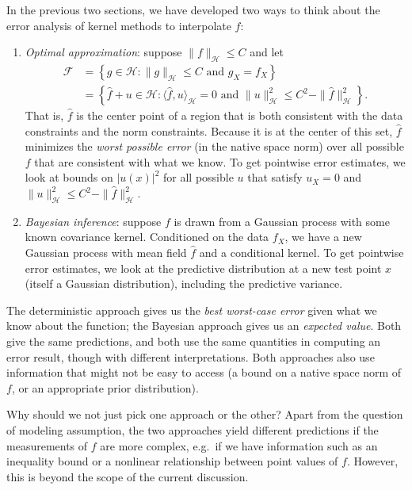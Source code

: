 \documentclass[12pt, leqno]{article} %
\begin{document}
In the previous two sections, we have developed two ways to think
about the error analysis of kernel methods to interpolate $f$:
\begin{enumerate}
\item {\em Optimal approximation}: suppose $\|f\|_{\mathcal{H}} \leq C$ and let
  \begin{align*}
  \mathcal{F} &=
    \left\{
    g \in \mathcal{H} : \|g\|_{\mathcal{H}} \leq C \mbox{ and } g_X = f_X
    \right\} \\
    &=
    \left\{
      \hat{f} + u \in \mathcal{H} :
      \langle \hat{f}, u \rangle_{\mathcal{H}} = 0 \mbox{ and }
      \|u\|_{\mathcal{H}}^2 \leq C^2 - \|\hat{f}\|_{\mathcal{H}}^2
    \right\}.
  \end{align*}
  That is, $\hat{f}$ is the center point of a region that is both
  consistent with the data constraints and the norm constraints.
  Because it is at the center of this set, $\hat{f}$
  minimizes the {\em worst possible error} (in the native space norm)
  over all possible $f$
  that are consistent with what we know.  To get pointwise error
  estimates, we look at bounds on $|u(x)|^2$ for all possible $u$ that
  satisfy $u_X = 0$ and $\|u\|_{\mathcal{H}}^2 \leq C^2 -
  \|\hat{f}\|_{\mathcal{H}}^2$.
\item {\em Bayesian inference}: suppose $f$ is drawn from a Gaussian
  process with some known covariance kernel.  Conditioned on the data
  $f_X$, we have a new Gaussian process with mean field $\hat{f}$
  and a conditional kernel.  To get pointwise error estimates, we look
  at the predictive distribution at a new test point $x$ (itself a
  Gaussian distribution), including the predictive variance.
\end{enumerate}
The deterministic approach gives us the {\em best worst-case error}
given what we know about the function; the Bayesian approach gives us
an {\em expected value}.  Both give the same predictions, and both
use the same quantities in computing an error result, though with
different interpretations.  Both approaches also use information that might
not be easy to access (a bound on a native space norm of $f$, or an
appropriate prior distribution).

Why should we not just pick one approach or the other?  Apart from the
question of modeling assumption, the two approaches yield different
predictions if the measurements of $f$ are more complex, e.g.~if we
have information such as an inequality bound or a nonlinear
relationship between point values of $f$.  However, this is beyond the
scope of the current discussion.
\end{document}
